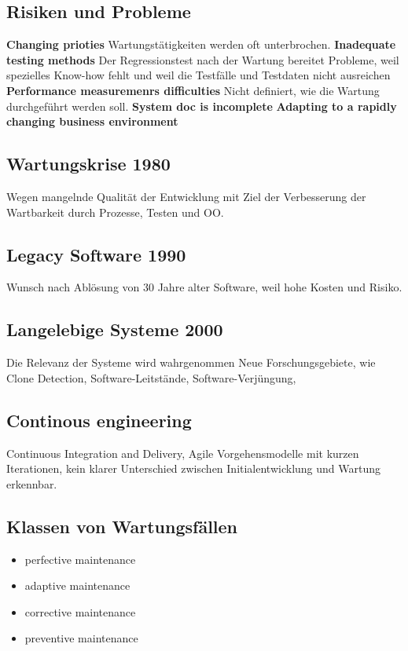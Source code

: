 \documentclass{book}
\begin{document}
    \subsection{Risiken und Probleme}
    \textbf{Changing prioties} Wartungstätigkeiten werden oft unterbrochen.
    \newline
    \textbf{Inadequate testing methods} Der Regressionstest nach der Wartung bereitet Probleme, weil spezielles
    Know-how fehlt und weil die Testfälle und Testdaten nicht ausreichen
    \newline
    \textbf{Performance measuremenrs difficulties}
    Nicht definiert, wie die Wartung durchgeführt werden  soll.
    \newline
    \textbf{System doc is incomplete}
    \newline
    \textbf{Adapting to a rapidly changing business environment}
    \subsection{Wartungskrise 1980}
    Wegen mangelnde Qualität der Entwicklung mit Ziel der Verbesserung der Wartbarkeit durch Prozesse, Testen und OO.
    \subsection{Legacy Software 1990}
    Wunsch nach Ablösung von 30 Jahre alter Software, weil hohe Kosten und Risiko.
    \subsection{Langelebige Systeme 2000}
    Die Relevanz der Systeme wird
    wahrgenommen
    Neue Forschungsgebiete, wie Clone Detection,
    Software-Leitstände, Software-Verjüngung,
    \subsection{Continous engineering}Continuous Integration and Delivery,
    Agile Vorgehensmodelle mit kurzen Iterationen, kein klarer Unterschied zwischen
    Initialentwicklung und Wartung erkennbar.
    \subsection{Klassen von Wartungsfällen}
    \begin{itemize}
        \item perfective maintenance
        \item adaptive maintenance
        \item corrective maintenance
        \item preventive maintenance

    \end{itemize}
\end{document}

